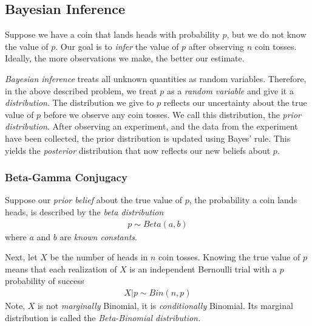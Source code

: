 \subsection{Bayesian Inference}

Suppose we have a coin that lands heads with probability \(p\), 
but we do not know the value of \(p\). 
Our goal is to \emph{infer} the value of \(p\) after observing \(n\) coin tosses. 
Ideally, 
the more observations we make, 
the better our estimate.

\emph{Bayesian inference} treats all unknown quantities as random variables. 
Therefore, 
in the above described problem, 
we treat \(p\) as a \emph{random variable} and give it a \emph{distribution}. 
The distribution we give to \(p\) reflects our uncertainty about the 
true value of \(p\) before we observe any coin tosses. 
We call this distribution, 
the \emph{prior distribution}. 
After observing an experiment, 
and the data from the experiment have been collected, 
the prior distribution is updated using Bayes' rule. 
This yields the \emph{posterior} distribution that now reflects 
our new beliefs about \(p\).

\subsubsection{Beta-Gamma Conjugacy}

Suppose our \emph{prior belief} about the true value of \(p\), 
the probability a coin lands heads, 
is described by the \emph{beta distribution}
\begin{align}
p \sim Beta(a,b)
\end{align}
where \(a\) and \(b\) are \emph{known constants}.

Next, 
let \(X\) be the number of heads in \(n\) coin tosses. 
Knowing the true value of \(p\) means that each realization of \(X\) is an 
independent Bernoulli trial with a \(p\) probability of success
\begin{align}
X|p \sim Bin(n,p)
\end{align}
Note, 
\(X\) is not \emph{marginally} Binomial, 
it is \emph{conditionally} Binomial. 
Its marginal distribution is called the \emph{Beta-Binomial distribution.}

